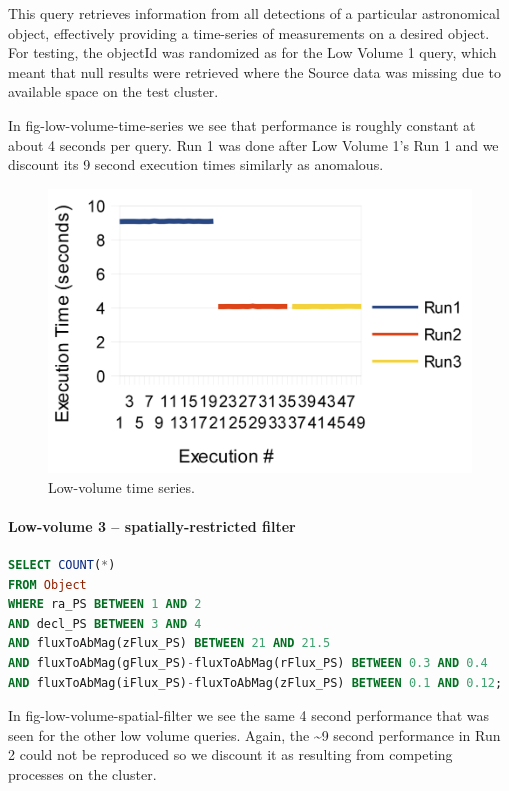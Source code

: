 \documentclass[DM,lsstdraft,toc]{lsstdoc}
\begin{document}
This query retrieves information from all detections of a particular
astronomical object, effectively providing a time-series of measurements
on a desired object. For testing, the objectId was randomized as for the
Low Volume 1 query, which meant that null results were retrieved where
the Source data was missing due to available space on the test cluster.

In fig-low-volume-time-series we see that performance is roughly
constant at about 4 seconds per query. Run 1 was done after Low Volume
1's Run 1 and we discount its 9 second execution times similarly as
anomalous.

\begin{figure}[H]
\centering
\includegraphics{_static/low_volume_time_series.png}
\caption{Low-volume time series.}
\end{figure}

\paragraph{Low-volume 3 -- spatially-restricted
filter}\label{low-volume-3-spatially-restricted-filter}

\begin{lstlisting}[language=SQL]
SELECT COUNT(*)
FROM Object
WHERE ra_PS BETWEEN 1 AND 2
AND decl_PS BETWEEN 3 AND 4
AND fluxToAbMag(zFlux_PS) BETWEEN 21 AND 21.5
AND fluxToAbMag(gFlux_PS)-fluxToAbMag(rFlux_PS) BETWEEN 0.3 AND 0.4
AND fluxToAbMag(iFlux_PS)-fluxToAbMag(zFlux_PS) BETWEEN 0.1 AND 0.12;
\end{lstlisting}

In fig-low-volume-spatial-filter we see the same 4 second performance
that was seen for the other low volume queries. Again, the
\textasciitilde{}9 second performance in Run 2 could not be reproduced
so we discount it as resulting from competing processes on the cluster.
\end{document}
